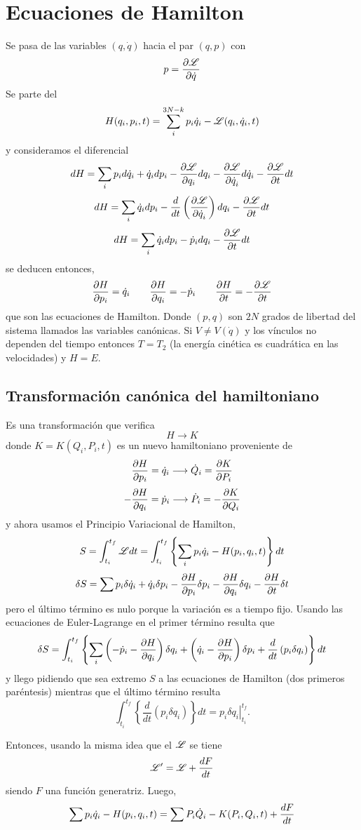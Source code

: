 \documentclass[10pt,oneside]{CBFT_book}
\begin{document}
\chapter{Ecuaciones de Hamilton}

Se pasa de las variables $(q, \dot{q})$ hacia el par $(q,p)$ con 
\[
	p = \dpar{\Lag}{\dot{q}}
\]
Se parte del 
\[
	H(q_i, p_i, t) = \sum_{i}^{3N-k} p_i \dot{q}_i - \Lag(q_i, \dot{q}_i, t)
\]
y consideramos el diferencial
\[
	dH = \sum_i p_i d\dot{q}_i + \dot{q}_i dp_i - \dpar{\Lag}{q_i} dq_i - \dpar{\Lag}{\dot{q}_i}d\dot{q}_i - \dpar{\Lag}{t}dt
\]
\[
	dH = \sum_i \dot{q}_i dp_i - \frac{d}{dt}\left( \dpar{\Lag}{\dot{q}_i} \right) dq_i - \dpar{\Lag}{t}dt
\]
\[
	dH = \sum_i \dot{q}_i dp_i - \dot{p}_i dq_i - \dpar{\Lag}{t}dt
\]
se deducen entonces,
\[
	\dpar{H}{p_i} = \dot{q}_i \qquad \dpar{H}{q_i} = -\dot{p}_i \qquad \dpar{H}{t} = -\dpar{\Lag}{t}
\]
que son las ecuaciones de Hamilton. Donde $(p,q)$ son $2N$ grados de libertad del sistema llamados las variables canónicas.
Si $V\neq V(\dot{q})$ y los vínculos no dependen del tiempo entonces $T=T_2$ (la energía cinética es cuadrática en las 
velocidades) y $H=E$.

\section{Transformación canónica del hamiltoniano}

Es una transformación que verifica
\[
	H \longrightarrow K
\]
donde $K=K(Q_i,P_i,t)$ es un nuevo hamiltoniano proveniente de
\[
	\dpar{H}{p_i} = \dot{q}_i \longrightarrow \dot{Q}_i = \dpar{K}{P_i}
\]
\[
	-\dpar{H}{q_i} = \dot{p}_i \longrightarrow \dot{P}_i = -\dpar{K}{Q_i}
\]
y ahora usamos el Principio Variacional de Hamilton,
\[
	S = \int_{t_i}^{t_f} \Lag dt = \int_{t_i}^{t_f}  \left\{ \sum_i p_i \dot{q}_i - H(p_i,q_i,t) \right\} dt
\]
\[
	\delta S = \sum p_i \delta \dot{q}_i +  \dot{q}_i \delta p_i  - \dpar{H}{p_i}\delta p_i 
	-\dpar{H}{q_i}\delta q_i  - \dpar{H}{t}\delta t
\]
pero el último término es nulo porque la variación es a tiempo fijo.
Usando las ecuaciones de Euler-Lagrange en el primer término resulta que 
\[
	\delta S = \int_{t_i}^{t_f}  \left\{ \sum_i \left(-\dot{p}_i -\dpar{H}{q_i} \right) \delta q_i +
	\left( \dot{q}_i - \dpar{H}{p_i} \right) \delta p_i + \frac{d}{dt}\left( p_i \delta q_i \right) \right\} dt
\]
y llego pidiendo que sea extremo $S$ a las ecuaciones de Hamilton (dos primeros paréntesis) mientras que el 
último término resulta 
\[
	\int_{t_i}^{t_f}  \left\{ \frac{d}{dt}\left( p_i \delta q_i \right) \right\} dt =
	\left. p_i \delta q_i \right|_{t_i}^{t_f}.
\]

Entonces, usando la misma idea que el $\Lag$ se tiene 
\[
	\Lag' = \Lag + \frac{dF}{dt}
\]
siendo $F$ una función generatriz. Luego,
\[
	\sum p_i \dot{q}_i - H(p_i,q_i,t) = \sum P_i\dot{Q}_i - K(P_i,Q_i,t) + \dtot{F}{t}
\]






\end{document}
